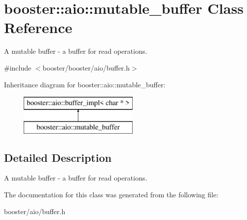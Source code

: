 \section{booster\-:\-:aio\-:\-:mutable\-\_\-buffer \-Class \-Reference}
\label{classbooster_1_1aio_1_1mutable__buffer}


\-A mutable buffer -\/ a buffer for read operations.  




{\ttfamily \#include $<$booster/booster/aio/buffer.\-h$>$}

\-Inheritance diagram for booster\-:\-:aio\-:\-:mutable\-\_\-buffer\-:\begin{figure}[H]
\begin{center}
\leavevmode
\includegraphics[height=2.000000cm]{classbooster_1_1aio_1_1mutable__buffer}
\end{center}
\end{figure}


\subsection{\-Detailed \-Description}
\-A mutable buffer -\/ a buffer for read operations. 

\-The documentation for this class was generated from the following file\-:\begin{DoxyCompactItemize}
\item 
booster/aio/buffer.\-h\end{DoxyCompactItemize}
